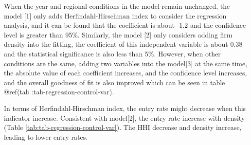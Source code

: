 \documentclass[
  12pt,
  oneside]{book}
\begin{document}
When the year and regional conditions in the model remain unchanged, the model {[}1{]} only adds Herfindahl-Hirschman index to consider the regression analysis, and it can be found that the coefficient is about -1.2 and the confidence level is greater than 95\%. Similarly, the model {[}2{]} only considers adding firm density into the fitting, the coefficient of this independent variable is about 0.38 and the statistical significance is also less than 5\%. However, when other conditions are the same, adding two variables into the model{[}3{]} at the same time, the absolute value of each coefficient increases, and the confidence level increases, and the overall goodness of fit is also improved which can be seen in table @ref(tab :tab-regression-control-var).

In terms of Herfindahl-Hirschman index, the entry rate might decrease when this indicator increase.
Consistent with model{[}2{]}, the entry rate increase with density (Table \ref{tab:tab-regression-control-var}). The HHI decrease and density increase, leading to lower entry rates.
\end{document}
